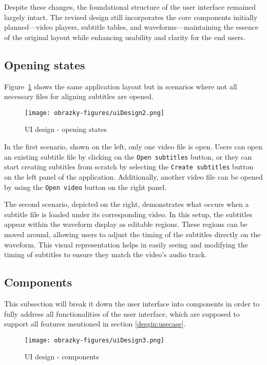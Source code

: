 Despite these changes, the foundational structure of the user interface remained largely intact. The revised design still incorporates the core components initially planned—video players, subtitle tables, and waveforms—maintaining the essence of the original layout while enhancing usability and clarity for the end users.

\subsection{Opening states}

Figure~\ref{fig:design:ui:2} shows the same application layout but in scenarios where not all necessary files for aligning subtitles are opened.

\begin{figure}[ht]
    \centering
    \texttt{[image: obrazky-figures/uiDesign2.png]}
    \caption{UI design - opening states}
    \label{fig:design:ui:2}
\end{figure}

In the first scenario, shown on the left, only one video file is open. Users can open an existing subtitle file by clicking on the \texttt{Open subtitles} button, or they can start creating subtitles from scratch by selecting the \texttt{Create subtitles} button on the left panel of the application. Additionally, another video file can be opened by using the \texttt{Open video} button on the right panel.

The second scenario, depicted on the right, demonstrates what occurs when a subtitle file is loaded under its corresponding video. In this setup, the subtitles appear within the waveform display as editable regions. These regions can be moved around, allowing users to adjust the timing of the subtitles directly on the waveform. This visual representation helps in easily seeing and modifying the timing of subtitles to ensure they match the video's audio track.

\subsection{Components}

This subsection will break it down the user interface into components in order to fully address all functionalities of the user interface,
which are supposed to support all features mentioned in section \ref{desgin:usecase}. 

\begin{figure}[ht]
\centering
\texttt{[image: obrazky-figures/uiDesign3.png]}
\caption{UI design - components}
\label{fig:design:ui:3}
\end{figure}

